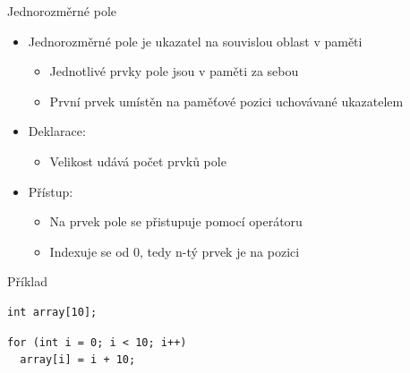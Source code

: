 \begin{frame}[fragile]{Jednorozměrné pole}

  \begin{itemize}
    \item Jednorozměrné pole je ukazatel na souvislou oblast v paměti
    \begin{itemize}
      \item Jednotlivé prvky pole jsou v paměti za sebou
      \item První prvek umístěn na paměťové pozici uchovávané ukazatelem
    \end{itemize}

    \pause

    \item Deklarace: 
    \begin{itemize}
      \item Velikost udává počet prvků pole
    \end{itemize}

    \pause

    \item Přístup: 
    \begin{itemize}
      \item Na prvek pole se přistupuje pomocí operátoru \code{[]}

      \pause

      \item Indexuje se od 0, tedy n-tý prvek je na pozici \code{[n-1]}
    \end{itemize}
  \end{itemize}


\begin{block}{Příklad}
\begin{lstlisting}
int array[10];
\end{lstlisting}
\begin{lstlisting}
for (int i = 0; i < 10; i++)
  array[i] = i + 10;
\end{lstlisting}
\end{block}

\end{frame}

